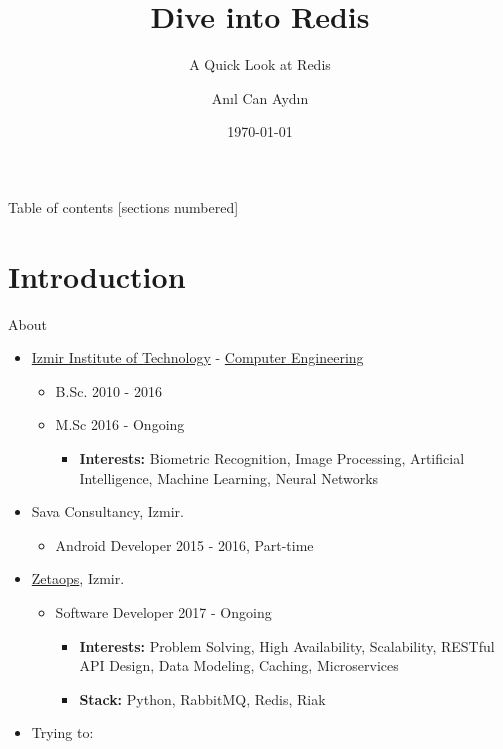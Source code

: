 \documentclass[10pt]{beamer}
\title{Dive into Redis}
\subtitle{A Quick Look at Redis}
\date{\today}
\author{An{\i}l Can Ayd{\i}n}
\institute{Zetaops}
\begin{document}
\maketitle

\begin{frame}{Table of contents}
  [sections numbered]
  \tableofcontents[hideallsubsections]
\end{frame}

\section{Introduction}
\begin{frame}[fragile]{About}
  \begin{itemize}
    \item \href{http://www.iyte.edu.tr/}{Izmir Institute of Technology} - \href{http://arf.iyte.edu.tr/}{Computer Engineering}
      \begin{itemize}
        \item B.Sc. 2010 - 2016
        \item M.Sc  2016 - Ongoing
          \begin{itemize}
            \item \textbf{Interests:} Biometric Recognition, Image Processing, Artificial
            Intelligence, Machine Learning, Neural Networks
          \end{itemize}
      \end{itemize}
    \item Sava Consultancy, Izmir.
      \begin{itemize}
        \item Android Developer 2015 - 2016, Part-time
      \end{itemize}
    \item \href{http://zetaops.io/}{Zetaops}, Izmir.
      \begin{itemize}
          \item Software Developer 2017 - Ongoing
            \begin{itemize}
              \item \textbf{Interests:} Problem Solving, High Availability, Scalability,
              RESTful API Design, Data Modeling, Caching, Microservices
              \item \textbf{Stack:} Python, RabbitMQ, Redis, Riak
            \end{itemize}
      \end{itemize}
    \item Trying to:

\end{itemize}
\end{frame}
\end{document}
